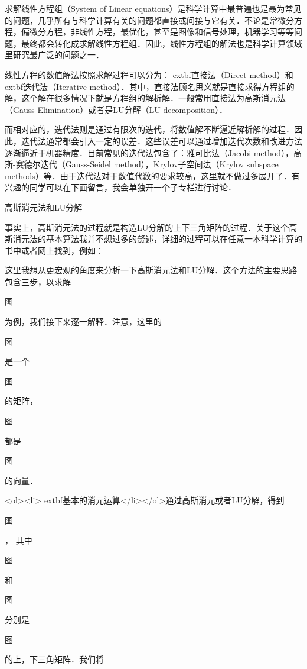 
求解线性方程组（System of Linear equations）是科学计算中最普遍也是最为常见的问题，几乎所有与科学计算有关的问题都直接或间接与它有关．不论是常微分方程，偏微分方程，非线性方程，最优化，甚至是图像和信号处理，机器学习等等问题，最终都会转化成求解线性方程组．因此，线性方程组的解法也是科学计算领域里研究最广泛的问题之一．

线性方程的数值解法按照求解过程可以分为：	extbf{直接法}（Direct method）和	extbf{迭代法}（Iterative method）．其中，直接法顾名思义就是直接求得方程组的解，这个解在很多情况下就是方程组的解析解．一般常用直接法为高斯消元法（Gauss Elimination）或者是LU分解（LU decomposition）．

而相对应的，迭代法则是通过有限次的迭代，将数值解不断逼近解析解的过程．因此，迭代法通常都会引入一定的误差．这些误差可以通过增加迭代次数和改进方法逐渐逼近于机器精度．目前常见的迭代法包含了：雅可比法（Jacobi method），高斯-赛德尔迭代（Gauss-Seidel method），Krylov子空间法（Krylov subspace methods）等．由于迭代法对于数值代数的要求较高，这里就不做过多展开了．有兴趣的同学可以在下面留言，我会单独开一个子专栏进行讨论．

高斯消元法和LU分解

事实上，高斯消元法的过程就是构造LU分解的上下三角矩阵的过程．关于这个高斯消元法的基本算法我并不想过多的赘述，详细的过程可以在任意一本科学计算的书中或者网上找到，例如：



这里我想从更宏观的角度来分析一下高斯消元法和LU分解．这个方法的主要思路包含三步，以求解

图

 为例，我们接下来逐一解释．注意，这里的

图

  是一个

图

 的矩阵，

图

 都是

图

 的向量．

<ol><li>	extbf{基本的消元运算}</li></ol>通过高斯消元或者LU分解，得到

图

 ， 其中

图

 和

图

 分别是

图

 的上，下三角矩阵．我们将


